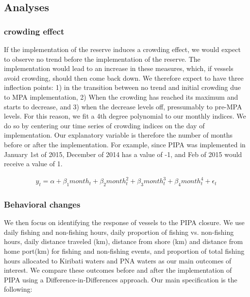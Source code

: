 \documentclass[9p,twocolumn,twoside,lineno]{pnas-new}
\begin{document}
\clearpage



\clearpage

\subsection{Analyses}

\subsubsection{crowding effect}

If the implementation of the reserve induces a crowding effect, we would expect to observe no trend before the implementation of the reserve. The implementation would lead to an increase in these measures, which,  if vessels avoid crowding, should then come back down. We therefore expect to have three inflection points: 1) in the transition between no trend and initial crowding due to MPA implementation, 2) When the crowding has reached its maximum and starts to decrease, and 3) when the decrease levels off, pressumably to pre-MPA levels. For this reason, we fit a 4th degree polynomial to our monthly indices. We do so by centering our time series of crowding indices on the day of implementation. Our explanatory variable is therefore the number of months before or after the implementation. For example, since PIPA was implemented in January 1st of 2015, December of 2014 has a value of -1, and Feb of 2015 would receive a value of 1.

\begin{figure}[h]
\begin{align*}
y_t = \alpha + \beta_1 month_t + \beta_2 month_t^2 + \beta_3 month_t^3 + \beta_4 month_t ^4 + \epsilon_t
\end{align*}
\end{figure}

\subsubsection{Behavioral changes}

We then focus on identifying the response of vessels to the PIPA closure. We use daily fishing and non-fishing hours, daily proportion of fishing vs. non-fishing hours, daily distance traveled (km), distance from shore (km) and distance from home port(km) for fishing and non-fishing events, and proportion of total fishing hours allocated to Kiribati waters and PNA waters as our main outcomes of interest. We compare these outcomes before and after the implementation of PIPA using a Difference-in-Differences approach. Our main specification is the following:
\end{document}
